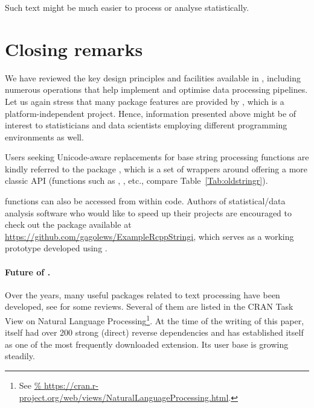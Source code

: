 \documentclass[nojss]{jss}\usepackage[]{graphicx}\usepackage[]{xcolor}
\begin{document}
Such text might be much easier to process or analyse statistically.



\section{Closing remarks}\label{Sec:conclusions}




We have reviewed the key design principles and facilities available in
, including numerous operations
that  help implement and optimise data processing pipelines.
Let us again stress that many package features are provided by , which
is a platform-independent project. Hence, information
presented above might be of interest to statisticians and data scientists
employing different programming environments as well.



Users seeking Unicode-aware replacements for base 
string processing functions are kindly referred to the 
package \citep{stringx}, which is a set of wrappers around 
offering a more classic API
(functions such as , , etc.,
compare Table~\ref{Tab:oldstringr}).


 functions can also be accessed from within 
code. Authors of statistical/data analysis software who would like to
speed up their projects are encouraged to check out
the  package available at
\url{https://github.com/gagolews/ExampleRcppStringi},
which serves as a working prototype developed using  \citep{rcppbook}.














\paragraph{Future of .}
Over the years, many useful  packages related
to text processing have been developed, see \citep{textminingr,textr}
for some reviews.
Several of them are listed in the CRAN Task View
on Natural Language Processing\footnote{
See \url{%
https://cran.r-project.org/web/views/NaturalLanguageProcessing.html}.
}.
At the time of the writing of this paper,
 itself had over 200 strong (direct) reverse dependencies
and has established itself as one of the most frequently downloaded
 extension. Its user base is growing steadily.
\end{document}
